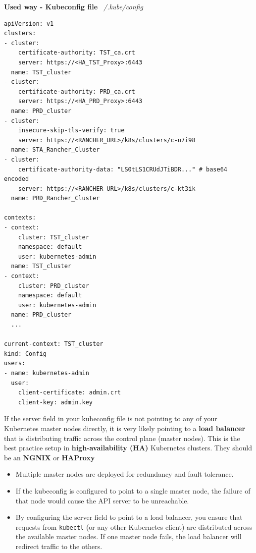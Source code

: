 \documentclass{article}
\newenvironment{blocktemplateII}[1]{%
    \tcolorbox[beamer,%
    noparskip,breakable,
    colframe=Green,%
    colbacklower=LimeGreen!75!LightGreen,%
    title=#1]}%
    {\endtcolorbox}
\newenvironment{codetemplate}[1][]{%
  \mybasecolorbox[#1]
  \itshape
}{%
  \endmybasecolorbox
}
\begin{document}
\textbf{Used way - Kubeconfig file}
\begin{codetemplate}{~/.kube/config}
\begin{verbatim}
apiVersion: v1
clusters:
- cluster:
    certificate-authority: TST_ca.crt
    server: https://<HA_TST_Proxy>:6443
  name: TST_cluster
- cluster:
    certificate-authority: PRD_ca.crt
    server: https://<HA_PRD_Proxy>:6443
  name: PRD_cluster
- cluster:
    insecure-skip-tls-verify: true
    server: https://<RANCHER_URL>/k8s/clusters/c-u7i98
  name: STA_Rancher_Cluster
- cluster:
    certificate-authority-data: "LS0tLS1CRUdJTiBDR..." # base64 encoded
    server: https://<RANCHER_URL>/k8s/clusters/c-kt3ik
  name: PRD_Rancher_Cluster

contexts:
- context:
    cluster: TST_cluster
    namespace: default
    user: kubernetes-admin
  name: TST_cluster
- context:
    cluster: PRD_cluster
    namespace: default
    user: kubernetes-admin
  name: PRD_cluster
  ...

current-context: TST_cluster
kind: Config
users:
- name: kubernetes-admin
  user:
    client-certificate: admin.crt
    client-key: admin.key
\end{verbatim}
\end{codetemplate}

\begin{blocktemplateII}{NOTE}
If the server field in your kubeconfig file is not pointing to any of your Kubernetes master nodes directly, it is very likely pointing to a \textbf{load balancer}
that is distributing traffic across the control plane (master nodes). 
This is the best practice setup in \textbf{high-availability (HA)} Kubernetes clusters. They should be an \textbf{NGNIX} or \textbf{HAProxy}
\begin{itemize}
    \item Multiple master nodes are deployed for redundancy and fault tolerance.
    \item If the kubeconfig is configured to point to a single master node, the failure of that node would cause the API server to be unreachable.
    \item By configuring the server field to point to a load balancer, you ensure that requests from \verb|kubectl| (or any other Kubernetes client) are distributed across the available master nodes. If one master node fails, the load balancer will redirect traffic to the others.
\end{itemize}
\end{blocktemplateII}
\end{document}
